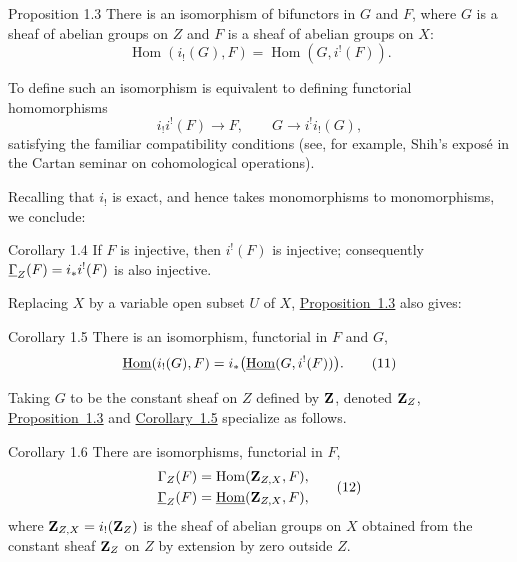 \begin{sgastatement}{Proposition 1.3}
There is an isomorphism of bifunctors in $G$ and $F$, where $G$ is a
sheaf of abelian groups on $Z$ and $F$ is a sheaf of abelian groups on
$X$:
\begin{equation}
  \operatorname{Hom}(i_!(G),F)
  =\operatorname{Hom}(G,i^!(F)).
  \tag{10}\label{eq:I.10}
\end{equation}
\end{sgastatement}

To define such an isomorphism is equivalent to defining functorial
homomorphisms
\[
  i_!i^!(F)\longrightarrow F,
  \qquad
  G\longrightarrow i^!i_!(G),
\]
satisfying the familiar compatibility conditions (see, for example,
Shih's expos\'e in the Cartan seminar on cohomological operations).

Recalling that $i_!$ is exact, and hence takes
monomorphisms to monomorphisms, we conclude:

\begin{sgastatement}{Corollary 1.4}
If $F$ is injective, then $i^!(F)$ is injective; consequently
$\mathop{\underline{\Gamma}}\nolimits_Z(F)=i_*i^!(F)$ is also injective.
\end{sgastatement}

Replacing $X$ by a variable open subset $U$ of $X$, \hyperref[I.1.3]{Proposition~1.3}
also gives:

\begin{sgastatement}{Corollary 1.5}
There is an isomorphism, functorial in $F$ and $G$,
\begin{equation}
  \mathop{\underline{\mathrm{Hom}}}\nolimits(i_!(G),F)=i_*\bigl(\mathop{\underline{\mathrm{Hom}}}\nolimits(G,i^!(F))\bigr).
  \tag{11}\label{eq:I.11}
\end{equation}
\end{sgastatement}

Taking $G$ to be the constant sheaf on $Z$ defined by $\mathbf Z$, denoted
$\mathbf Z_Z$, \hyperref[I.1.3]{Proposition~1.3} and \hyperref[I.1.5]{Corollary~1.5} specialize as follows.

\begin{sgastatement}{Corollary 1.6}
There are isomorphisms, functorial in $F$,
\begin{equation}
  \begin{aligned}
    \Gamma_Z(F)&=\operatorname{Hom}(\mathbf Z_{Z,X},F),\\
    \mathop{\underline{\Gamma}}\nolimits_Z(F)&=\mathop{\underline{\mathrm{Hom}}}\nolimits(\mathbf Z_{Z,X},F),
  \end{aligned}
  \tag{12}\label{eq:I.12}
\end{equation}
where $\mathbf Z_{Z,X}=i_!(\mathbf Z_Z)$ is the sheaf of abelian groups on $X$
obtained from the constant sheaf $\mathbf Z_Z$ on $Z$ by extension by zero
outside $Z$.
\end{sgastatement}


